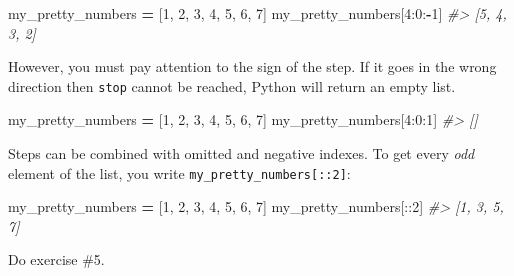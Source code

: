 \documentclass[
]{book}
\newenvironment{Shaded}{\begin{snugshade}}{\end{snugshade}}
\newcommand{\CommentTok}[1]{\textcolor[rgb]{0.56,0.35,0.01}{\textit{#1}}}
\newcommand{\DecValTok}[1]{\textcolor[rgb]{0.00,0.00,0.81}{#1}}
\newcommand{\NormalTok}[1]{#1}
\newcommand{\OperatorTok}[1]{\textcolor[rgb]{0.81,0.36,0.00}{\textbf{#1}}}
\begin{document}
\begin{Shaded}
\begin{Highlighting}[]
\NormalTok{my\_pretty\_numbers }\OperatorTok{=}\NormalTok{ [}\DecValTok{1}\NormalTok{, }\DecValTok{2}\NormalTok{, }\DecValTok{3}\NormalTok{, }\DecValTok{4}\NormalTok{, }\DecValTok{5}\NormalTok{, }\DecValTok{6}\NormalTok{, }\DecValTok{7}\NormalTok{]}
\NormalTok{my\_pretty\_numbers[}\DecValTok{4}\NormalTok{:}\DecValTok{0}\NormalTok{:}\OperatorTok{{-}}\DecValTok{1}\NormalTok{]}
\CommentTok{\#\textgreater{} [5, 4, 3, 2]}
\end{Highlighting}
\end{Shaded}

However, you must pay attention to the sign of the step. If it goes in the wrong direction then \texttt{stop} cannot be reached, Python will return an empty list.

\begin{Shaded}
\begin{Highlighting}[]
\NormalTok{my\_pretty\_numbers }\OperatorTok{=}\NormalTok{ [}\DecValTok{1}\NormalTok{, }\DecValTok{2}\NormalTok{, }\DecValTok{3}\NormalTok{, }\DecValTok{4}\NormalTok{, }\DecValTok{5}\NormalTok{, }\DecValTok{6}\NormalTok{, }\DecValTok{7}\NormalTok{]}
\NormalTok{my\_pretty\_numbers[}\DecValTok{4}\NormalTok{:}\DecValTok{0}\NormalTok{:}\DecValTok{1}\NormalTok{]}
\CommentTok{\#\textgreater{} []}
\end{Highlighting}
\end{Shaded}

Steps can be combined with omitted and negative indexes. To get every \emph{odd} element of the list, you write \texttt{my\_pretty\_numbers{[}::2{]}}:

\begin{Shaded}
\begin{Highlighting}[]
\NormalTok{my\_pretty\_numbers }\OperatorTok{=}\NormalTok{ [}\DecValTok{1}\NormalTok{, }\DecValTok{2}\NormalTok{, }\DecValTok{3}\NormalTok{, }\DecValTok{4}\NormalTok{, }\DecValTok{5}\NormalTok{, }\DecValTok{6}\NormalTok{, }\DecValTok{7}\NormalTok{]}
\NormalTok{my\_pretty\_numbers[::}\DecValTok{2}\NormalTok{]}
\CommentTok{\#\textgreater{} [1, 3, 5, 7]}
\end{Highlighting}
\end{Shaded}

Do exercise \#5.
\end{document}
